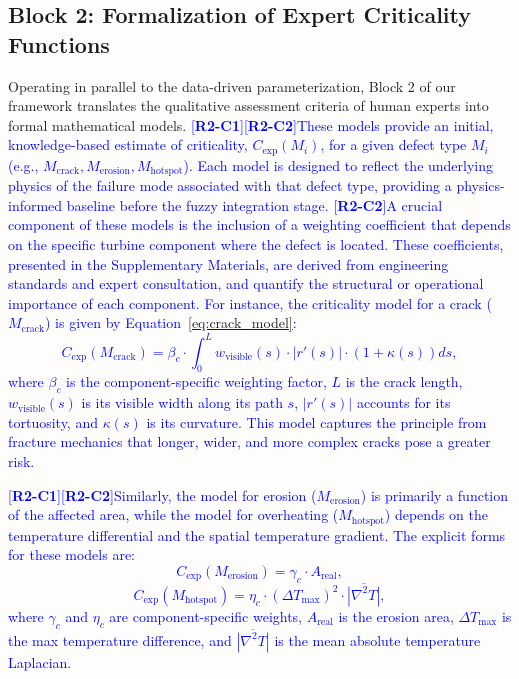 \documentclass[energies,article,submit,pdftex,moreauthors]{Definitions/mdpi}
\newcommand{\revtag}[2]{[\textbf{R#1-C#2}]}
\newcommand{\Rtwo}[1]{\textcolor{blue}{#1}}
\begin{document}
\subsection{Block 2: Formalization of Expert Criticality Functions}
Operating in parallel to the data-driven parameterization, Block 2 of our framework translates the qualitative assessment criteria of human experts into formal mathematical models. \Rtwo{\revtag{2}{1}}\Rtwo{\revtag{2}{2}These models provide an initial, knowledge-based estimate of criticality, \(C_{\text{exp}}(M_i)\), for a given defect type \(M_i\) (e.g., \(M_{\text{crack}}, M_{\text{erosion}}, M_{\text{hotspot}}\)). Each model is designed to reflect the underlying physics of the failure mode associated with that defect type, providing a physics-informed baseline before the fuzzy integration stage.} \Rtwo{\revtag{2}{2}A crucial component of these models is the inclusion of a weighting coefficient that depends on the specific turbine component where the defect is located. These coefficients, presented in the Supplementary Materials, are derived from engineering standards and expert consultation, and quantify the structural or operational importance of each component. For instance, the criticality model for a crack (\(M_{\text{crack}}\)) is given by Equation~\ref{eq:crack_model}:
\begin{equation}
    C_{\text{exp}}(M_{\text{crack}}) = \beta_c \cdot \int_0^L w_{\text{visible}}(s) \cdot |r'(s)| \cdot (1 + \kappa(s)) ds,
    \label{eq:crack_model}
\end{equation}
where \(\beta_c\) is the component-specific weighting factor, \(L\) is the crack length, \(w_{\text{visible}}(s)\) is its visible width along its path \(s\), \(|r'(s)|\) accounts for its tortuosity, and \(\kappa(s)\) is its curvature. This model captures the principle from fracture mechanics that longer, wider, and more complex cracks pose a greater risk.}

\Rtwo{\revtag{2}{1}}\Rtwo{\revtag{2}{2}Similarly, the model for erosion (\(M_{\text{erosion}}\)) is primarily a function of the affected area, while the model for overheating (\(M_{\text{hotspot}}\)) depends on the temperature differential and the spatial temperature gradient. The explicit forms for these models are:
\begin{equation}
    C_{\text{exp}}(M_{\text{erosion}}) = \gamma_c \cdot A_{\text{real}},
    \label{eq:erosion_model}
\end{equation}
\begin{equation}
    C_{\text{exp}}(M_{\text{hotspot}}) = \eta_c \cdot (\Delta T_{\max})^2 \cdot \overline{|\nabla^2 T|},
    \label{eq:hotspot_model}
\end{equation}
where \(\gamma_c\) and \(\eta_c\) are component-specific weights, \(A_{\text{real}}\) is the erosion area, \(\Delta T_{\max}\) is the max temperature difference, and \(\overline{|\nabla^2 T|}\) is the mean absolute temperature Laplacian.}
\end{document}
